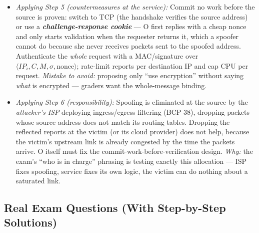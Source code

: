 \documentclass[12pt, a4paper]{article}
\newcommand{\term}[1]{\textbf{\textit{#1}}}        %
\begin{document}
\begin{itemize}
    \item \textit{Applying Step 5 (countermeasures at the service):} Commit no work before the source is proven: switch to TCP (the handshake verifies the source address) or use a \term{challenge-response cookie} --- O first replies with a cheap nonce and only starts validation when the requester returns it, which a spoofer cannot do because she never receives packets sent to the spoofed address. Authenticate the \emph{whole} request with a MAC/signature over $\langle IP_i, C, M, \sigma, \text{nonce} \rangle$; rate-limit reports per destination IP and cap CPU per request. \emph{Mistake to avoid:} proposing only ``use encryption'' without saying \emph{what} is encrypted --- graders want the whole-message binding.
    \item \textit{Applying Step 6 (responsibility):} Spoofing is eliminated at the source by the \emph{attacker's ISP} deploying ingress/egress filtering (BCP 38), dropping packets whose source address does not match its routing tables. Dropping the reflected reports at the victim (or its cloud provider) does not help, because the victim's upstream link is already congested by the time the packets arrive. O itself must fix the commit-work-before-verification design. \emph{Why:} the exam's ``who is in charge'' phrasing is testing exactly this allocation --- ISP fixes spoofing, service fixes its own logic, the victim can do nothing about a saturated link.
\end{itemize}

\subsection*{Real Exam Questions (With Step-by-Step Solutions)}
\end{document}
